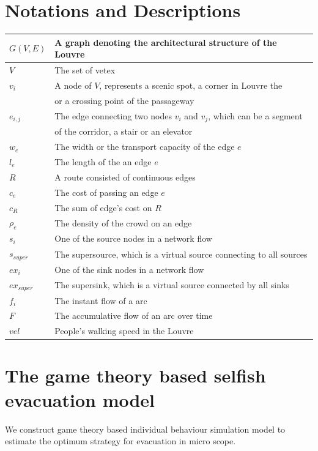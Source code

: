 \documentclass{mcmthesis}
\begin{document}
\section{Notations and Descriptions}
	\begin{tabular}{l|l}
		\hline
		$G(V,E)$  & A graph denoting the architectural structure of the Louvre
		 \bigstrut\\
		\hline
		$V$  &  The set of vetex \bigstrut\\
		\hline
		$v_i$  & A node of $V$, represents a scenic spot, a corner in Louvre the  \bigstrut\\
		& or a crossing point of the passageway \\
		\hline
		$e_{i,j}​$  & The edge connecting two nodes $v_i$ and $v_j$, which can be a segment \\ 
		& of the corridor, a stair or an elevator \bigstrut\\
		\hline
	$​w_e$  & The width or the transport capacity of the  edge $e$  \bigstrut\\
		\hline
		$l_e$  & The length of the an edge $e$ \bigstrut\\
		\hline
		$R$  &  A route consisted of continuous edges  \bigstrut\\
		\hline
		$c_e$     & The cost of passing  an edge $e$ \bigstrut\\
		\hline
		$c_R$   & The sum of edge's cost on $R$  \bigstrut\\
		\hline
		$\rho_e$  &The density of the crowd  on an edge \bigstrut\\
		\hline
		$s_i$  & One of the source nodes in a network flow \bigstrut\\
		\hline
		$s_{super}​$  & The supersource, which is a virtual source connecting to all sources
 \bigstrut\\
		\hline
		$ex_i$     & One of the sink nodes in a network flow  \bigstrut\\
		\hline
		$ex_{super}$ &The supersink, which is a virtual source connected by all sinks 
		 \bigstrut\\
		\hline
		$f_i$ & The instant flow of a arc \bigstrut\\
		\hline
		$F$ &  The accumulative flow of an arc over time \bigstrut\\
		\hline
		$vel$     &   People's walking speed in the Louvre \bigstrut\\
		\hline
	\end{tabular}%
	\label{tab:addlabel}%
\section{The game theory based selfish evacuation  model}
We construct game theory based individual behaviour simulation model to estimate the optimum strategy for evacuation in micro scope.
\end{document}
